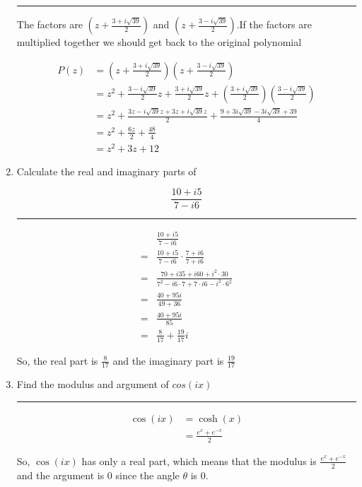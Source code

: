 \documentclass[12pt, oneside]{article}
\newenvironment{answer}
  {\vspace*{0.2cm} \rule{12cm}{0.02cm} \vspace*{0.2cm}}
  {\vspace*{0.2cm}}
\begin{document}
\begin{enumerate}
\begin{answer}
      The factors are $(z + \frac{3 + i\sqrt{39}}{2})$ and $(z + \frac{3 - i\sqrt{39}}{2})$.If the factors are multiplied together we should get back to the original polynomial

      \begin{align*}
        P(z) &= (z + \frac{3 + i\sqrt{39}}{2})(z + \frac{3 - i\sqrt{39}}{2})\\
             &= z^2 + \frac{3-i\sqrt{39}}{2}z + \frac{3 + i\sqrt{39}}{2}z + (\frac{3 + i\sqrt{39}}{2})(\frac{3 - i\sqrt{39}}{2})\\
             &= z^2 + \frac{3z - i\sqrt{39}z + 3z + i\sqrt{39}z}{2} + \frac{9 + 3i\sqrt{39} - 3i\sqrt{39} + 39}{4}\\
             &= z^2 + \frac{6z}{2} + \frac{48}{4}\\
             &= z^2 + 3z + 12
      \end{align*}

    \end{answer}

  \item Calculate the real and imaginary parts of

  \begin{equation*}
    \frac{10+i5}{7-i6}
  \end{equation*}

    \begin{answer}

      \begin{align*}
        &\frac{10+i5}{7-i6}\\
        = &\frac{10+i5}{7-i6}\cdot\frac{7+i6}{7+i6}\\
        = &\frac{70 + i35 + i60 + i^2\cdot30}{7^2 -i6\cdot7 + 7\cdot i6 -i^2\cdot6^2}\\
        = &\frac{40+95i}{49+36}\\
        =&\frac{40+95i}{85}\\
        =&\frac{8}{17} + \frac{19}{17}i
      \end{align*}

      So, the real part is $\frac{8}{17}$ and the imaginary part is $\frac{19}{17}$
    \end{answer}

  \item Find the modulus and argument of $cos(ix)$

    \begin{answer}

      \begin{align*}
        \cos(ix) &= \cosh(x)\\
                 &= \frac{e^x+e^{-x}}{2}
      \end{align*}

      So, $\cos(ix)$ has only a real part, which means that the modulus is $\frac{e^x+e^{-x}}{2}$ and the argument is 0 since the angle $\theta$ is 0.
    \end{answer}


\end{enumerate}
\end{document}
